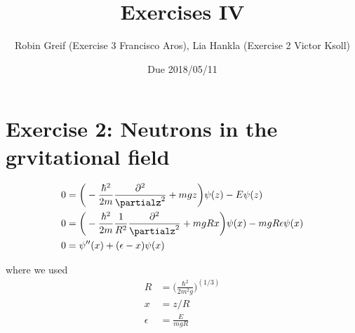 \documentclass[12pt,a4paper,twoside]{article}
\title{Exercises IV}
\author{Robin Greif (Exercise 3 Francisco Aros), Lia Hankla (Exercise 2 Victor Ksoll)}
\date{Due 2018/05/11}
\begin{document}
\maketitle

\section*{Exercise 2: Neutrons in the grvitational field}

\begin{align*}
  0 &= \bigg(-\frac{\hbar^2}{2m} \frac{\partial^2}{\partialz^2} + mgz \bigg)
            \psi(z) - E \psi(z)  \\     
  0 &= \bigg(-\frac{\hbar^2}{2m} \frac{1}{R^2} \frac{\partial^2}{\partialz^2} + mgRx \bigg)
            \psi(x) - mgR\epsilon \psi(x)  \\       
  0 &= \psi''(x) + (\epsilon - x) \psi(x)  
\end{align*}

where we used
\begin{align*}
  R &= \bigg( \frac{\hbar^2}{2m^2g} \bigg) ^(1/3)  \\
  x &= z/R  \\
  \epsilon &= \frac{E}{mgR}  
\end{align*}
\end{document}
